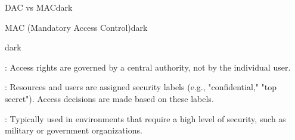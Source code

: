 \begin{baseBoxThree}{DAC vs MAC}{dark}
\begin{baseBoxThree}{MAC (Mandatory Access Control)}{dark}
\begin{baseBoxThree}{}{dark}
            \smallskip
        \end{baseBoxThree}
        \smallskip
        \begin{posnexItemize}
            \item[\sA] : Access rights are governed by a central authority, not by the individual user.
            \item[\sA] : Resources and users are assigned security labels (e.g., "confidential," "top secret"). Access decisions are made based on these labels.
            \item[\sA] : Typically used in environments that require a high level of security, such as military or government organizations.
        \end{posnexItemize}
        \smallskip
    \end{baseBoxThree}
    \smallskip
\end{baseBoxThree}
